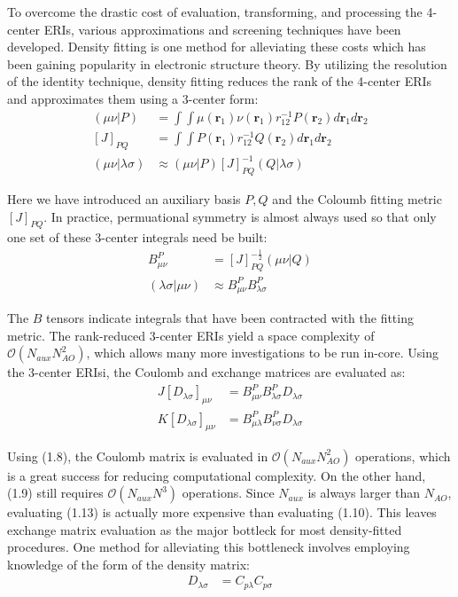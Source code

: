 To overcome the drastic cost of evaluation, transforming, and processing the 4-center ERIs, various approximations 
and screening techniques have been developed.  
Density fitting is one method for alleviating these costs which has been gaining popularity in electronic structure theory.
By utilizing the resolution of the identity technique, 
density fitting reduces the rank of the 4-center ERIs and approximates them using a 3-center form: 
\begin{align} 
(\mu \nu|P) &= \int \int \mu(\textbf{r}_{1}) 
\nu(\textbf{r}_{1}) r^{-1}_{12} P(\textbf{r}_{2}) d\textbf{r}_{1} d\textbf{r}_{2} \\
[J]_{PQ} &= \int \int P(\textbf{r}_1)r_{12}^{-1}Q(\textbf{r}_2) d{\textbf{r}_{1}}d{\textbf{r}_{2}} \\
(\mu \nu|\lambda \sigma) &\approx (\mu \nu| P)[J]_{PQ}^{-1}(Q|\lambda \sigma)  
\end{align} 

\noindent Here we have introduced an auxiliary basis $P, Q$ and the Coloumb fitting metric $[J]_{PQ}$. 
In practice, permuational symmetry is almost always used so that only one set of these 3-center integrals need be built:
\begin{align} 
B_{\mu \nu}^P &= [J]_{PQ}^{-\frac{1}{2}}(\mu \nu | Q)  \\ 
(\lambda \sigma | \mu \nu) &\approx  B_{\mu \nu}^P B_{\lambda \sigma}^P  \end{align} 

\noindent The $B$ tensors indicate integrals that have been contracted with the fitting metric.
The rank-reduced 3-center ERIs yield a space complexity of $\mathcal{O}(N_{aux}N_{AO}^2)$, 
which allows many more investigations to be run in-core.  
Using the 3-center ERIsi, the Coulomb and exchange matrices are evaluated as: 
\begin{align}
J[D_{\lambda \sigma}]_{\mu \nu} &= B_{\mu \nu}^P B_{\lambda \sigma}^PD_{\lambda \sigma} \\
K[D_{\lambda \sigma}]_{\mu \nu} &= B_{\mu \lambda}^P B_{\nu \sigma}^PD_{\lambda \sigma}
\end{align}

\noindent Using (1.8), the Coulomb matrix is evaluated in $\mathcal{O}(N_{aux}N_{AO}^2)$ operations, which is a great success
for reducing computational complexity. On the other hand, (1.9) still requires $\mathcal{O}(N_{aux}N^3)$ operations. 
Since $N_{aux}$ is always larger than $N_{AO}$, evaluating (1.13) is actually more expensive than evaluating (1.10).
This leaves exchange matrix evaluation as the major bottleck for most density-fitted procedures.
One method for alleviating this bottleneck involves employing knowledge 
of the form of the density matrix:
\begin{align}
D_{\lambda \sigma} &= C_{p\lambda}C_{p\sigma} 
\end{align}

